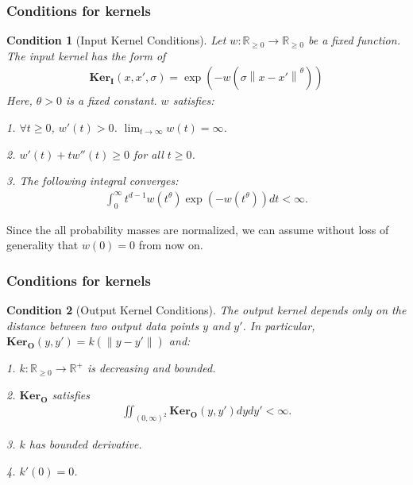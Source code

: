 \documentclass{beamer}
\newcommand{\ki}{\mathbf{Ker}_{\mathbf{I}}}
\newcommand{\ko}{\mathbf{Ker}_{\mathbf{O}}}
\newcommand\norm[1]{\left\lVert#1\right\rVert}
\newtheorem{condition}{\bf Condition}
\begin{document}
\begin{frame}
  \frametitle{Conditions for kernels}
  \begin{condition}[Input Kernel Conditions] \label{input_kernel_conditions}
    Let $w: \mathbb{R}_{\geq 0} \to \mathbb{R}_{\geq 0}$ be a fixed function. The input kernel has the form of
    \begin{align} \label{tsne:input_kernel}
      \ki(x,x',\sigma) = \exp(-w(\sigma\norm{x-x'}^{\theta}))
    \end{align}
    Here, $\theta>0$ is a fixed constant. $w$ satisfies:

    1. $\forall t \geq 0$, $w'(t)>0$. $\lim_{t \to \infty} w(t) = \infty$.

    2. $w'(t)+tw''(t) \geq 0$ for all $t \geq 0$.

    3. The following integral converges:
    \begin{align}
      \int_0^{\infty} t^{d-1} w(t^{\theta}) \exp(-w(t^{\theta}))dt < \infty.
    \end{align}
  \end{condition}
  Since the all probability masses are normalized, we can assume without loss of generality that $w(0)=0$ from now on.
\end{frame}

\begin{frame}
  \frametitle{Conditions for kernels}
  \begin{condition}[Output Kernel Conditions] \label{output_kernel_conditions}
    The output kernel depends only on the distance between two output data points $y$ and $y'$. In particular, $\ko(y,y') = k (\norm{y-y'})$ and:

    1. $k: \mathbb{R}_{\geq 0} \to \mathbb{R}^+$ is decreasing and bounded.

    2. $\ko$ satisfies
    \begin{align}
      \iint_{(0,\infty)^2} \ko(y,y') dy dy' < \infty.
    \end{align}

    3. $k$ has bounded derivative.

    4. $k'(0) = 0$.
  \end{condition}
\end{frame}
\end{document}
